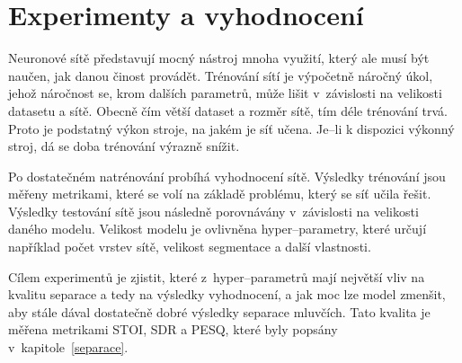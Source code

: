 \bigskip






\chapter{Experimenty a vyhodnocení}
\label{experimenty}
Neuronové sítě představují mocný nástroj mnoha využití, který ale musí být naučen, jak danou činost provádět. Trénování sítí je výpočetně náročný úkol, jehož náročnost se, krom dalších parametrů, může lišit v~závislosti na velikosti datasetu a sítě. Obecně čím větší dataset a rozměr sítě, tím déle trénování trvá. Proto je podstatný výkon stroje, na jakém je síť učena. Je--li k dispozici výkonný stroj, dá se doba trénování výrazně snížit.

Po dostatečném natrénování probíhá vyhodnocení sítě. Výsledky trénování jsou měřeny metrikami, které se volí na základě problému, který se síť učila řešit. Výsledky testování sítě jsou následně porovnávány v~závislosti na velikosti daného modelu. Velikost modelu je ovlivněna hyper--parametry, které určují například počet vrstev sítě, velikost segmentace a další vlastnosti.

Cílem experimentů je zjistit, které z~hyper--parametrů mají největší vliv na kvalitu separace a tedy na výsledky vyhodnocení, a jak moc lze model zmenšit, aby stále dával dostatečně dobré výsledky separace mluvčích. Tato kvalita je měřena metrikami STOI, SDR a PESQ, které byly popsány v~kapitole~\ref{separace}.


